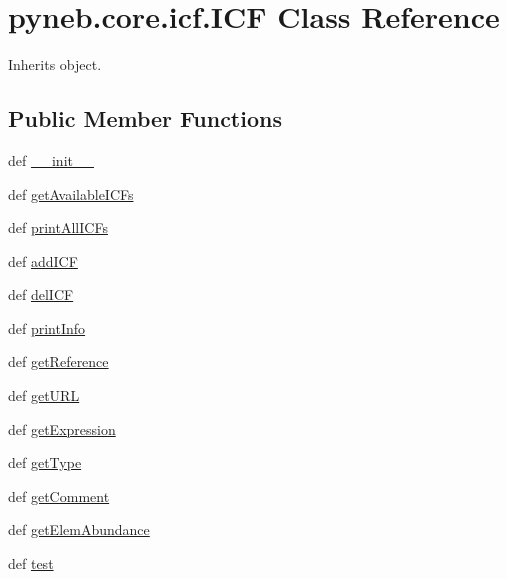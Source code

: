 \hypertarget{classpyneb_1_1core_1_1icf_1_1_i_c_f}{\section{pyneb.\-core.\-icf.\-I\-C\-F Class Reference}
\label{classpyneb_1_1core_1_1icf_1_1_i_c_f}
}


Inherits object.

\subsection*{Public Member Functions}
\begin{DoxyCompactItemize}
\item 
def \hyperlink{classpyneb_1_1core_1_1icf_1_1_i_c_f_a34b2e400d72f242fe19a26da72e9645b}{\-\_\-\-\_\-init\-\_\-\-\_\-}
\item 
def \hyperlink{classpyneb_1_1core_1_1icf_1_1_i_c_f_a4cacc6d494ce482990e513f4cf728e30}{get\-Available\-I\-C\-Fs}
\item 
def \hyperlink{classpyneb_1_1core_1_1icf_1_1_i_c_f_a49885ca930ec64edb2a9e972585cbb37}{print\-All\-I\-C\-Fs}
\item 
def \hyperlink{classpyneb_1_1core_1_1icf_1_1_i_c_f_a73cd32a765aaeaf1ac3dac231e9f0a72}{add\-I\-C\-F}
\item 
def \hyperlink{classpyneb_1_1core_1_1icf_1_1_i_c_f_ac095f16b76f6f4f62f96465b01323f91}{del\-I\-C\-F}
\item 
def \hyperlink{classpyneb_1_1core_1_1icf_1_1_i_c_f_a156850dec8c7457034434b3080c9a517}{print\-Info}
\item 
def \hyperlink{classpyneb_1_1core_1_1icf_1_1_i_c_f_a90b32c028a9e441aa3a80a215a4be58c}{get\-Reference}
\item 
def \hyperlink{classpyneb_1_1core_1_1icf_1_1_i_c_f_af27cec8e87d89720ee65fba6e28c2d9e}{get\-U\-R\-L}
\item 
def \hyperlink{classpyneb_1_1core_1_1icf_1_1_i_c_f_ad9e5250afc13ea42c6eedbc1bc0b860c}{get\-Expression}
\item 
def \hyperlink{classpyneb_1_1core_1_1icf_1_1_i_c_f_a96c632a868e90cdd20ba7a091aa73207}{get\-Type}
\item 
def \hyperlink{classpyneb_1_1core_1_1icf_1_1_i_c_f_a3bf3857377fc4d8b7609423a2ff26345}{get\-Comment}
\item 
def \hyperlink{classpyneb_1_1core_1_1icf_1_1_i_c_f_a30b52d6d1ec148fba7c0a15cad653f61}{get\-Elem\-Abundance}
\item 
def \hyperlink{classpyneb_1_1core_1_1icf_1_1_i_c_f_a3f8b36c58faee2f30bbb12d761451a77}{test}
\end{DoxyCompactItemize}
